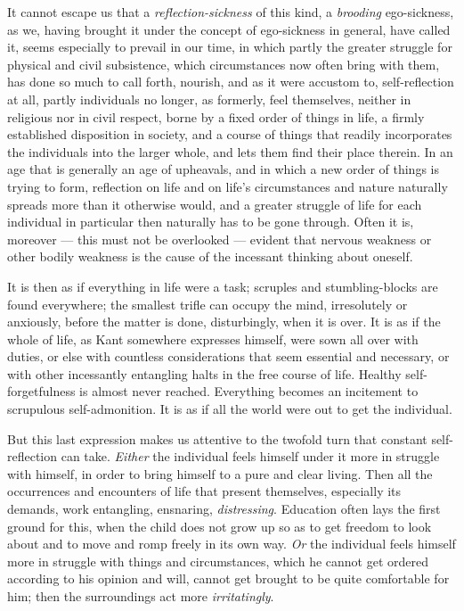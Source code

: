 \documentclass[12pt,a4paper,openany]{book}
\newcommand{\opage}[1]{\marginnote{\footnotesize\textit{[#1]}}}
\begin{document}
It cannot escape us that a \emph{reflection-sickness} of this kind, a
\emph{brooding} ego-sickness, as we, having brought it under the concept of
ego-sickness in general, have called it, seems especially to prevail in our time, in
which partly the greater struggle for physical and civil subsistence, which
circumstances now often bring with them, has done so much to call forth, nourish,
and as it were accustom to, self-reflection at all, partly individuals no longer, as
formerly, feel themselves, neither in religious nor in civil respect, borne by a
fixed order of things in life, a firmly established disposition in society, and a
course of things that readily incorporates the
\setcounter{footnote}{0}%
\opage{118}individuals into the larger whole, and lets them find their place therein. In an
age that is generally an age of upheavals, and in which a new order of things is
trying to form, reflection on life and on life's circumstances and nature naturally
spreads more than it otherwise would, and a greater struggle of life for each
individual in particular then naturally has to be gone through. Often it is,
moreover --- this must not be overlooked --- evident that nervous weakness or other
bodily weakness is the cause of the incessant thinking about oneself.

It is then as if everything in life were a task; scruples and stumbling-blocks are
found everywhere; the smallest trifle can occupy the mind, irresolutely or
anxiously, before the matter is done, disturbingly, when it is over. It is as if the
whole of life, as Kant somewhere expresses himself, were sown all over with duties,
or else with countless considerations that seem essential and necessary, or with
other incessantly entangling halts in the free course of life. Healthy
self-forgetfulness is almost never reached. Everything becomes an incitement to
scrupulous self-admonition. It is as if all the world were out to get the
individual.

But this last expression makes us attentive to the twofold turn that constant
self-reflection can take. \emph{Either} the individual feels himself under it more in
struggle with himself, in order to bring himself to a pure and clear living. Then
all the occurrences and encounters of life that present themselves, especially its
demands, work entangling, ensnaring, \emph{distressing}. Education often lays the
first ground for this, when the child does not grow up so as to get freedom to look
about and to move and romp freely in its own way. \emph{Or} the individual feels
himself more in struggle with things and circumstances, which he cannot get ordered
according to his opinion and will, cannot get brought to be quite comfortable for
him; then the surroundings act more \emph{irritatingly}.
\end{document}
